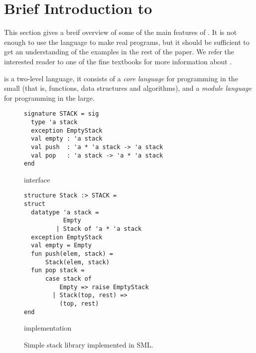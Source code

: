 \documentclass[workingdraft]{usetex-v1}
\begin{document}
\section{Brief Introduction to \sml{}}
\label{sec:brief-intr-sml}

This section gives a breif overview of some of the main features of
\sml{}.  It is not enough to use the language to make real programs,
but it should be sufficient to get an understanding of the examples in
the rest of the paper.  We refer the interested reader to one of the
fine textbooks \cite{Hansen-Rischel:1999,Paulson:1996} for more
information about \sml{}.



\sml{} is a two-level language, it consists of a \emph{core language}
for programming in the small (that is, functions, data structures and
algorithms), and a \emph{module language} for programming in the large.


\begin{figure*}[thp]
\mbox{}\hfill{}

\begin{subfloat}
\begin{minipage}[b]{.46\linewidth}
\begin{verbatim}
signature STACK = sig 
  type 'a stack
  exception EmptyStack
  val empty : 'a stack
  val push  : 'a * 'a stack -> 'a stack
  val pop   : 'a stack -> 'a * 'a stack
end
\end{verbatim}
\end{minipage}
\caption{\label{fig:stack-sig}interface}
\end{subfloat}
\qquad
\begin{subfloat}
\begin{minipage}[b]{.46\linewidth}
\begin{verbatim}
structure Stack :> STACK =
struct
  datatype 'a stack =
           Empty
         | Stack of 'a * 'a stack
  exception EmptyStack
  val empty = Empty
  fun push(elem, stack) = 
      Stack(elem, stack)
  fun pop stack =
      case stack of
          Empty => raise EmptyStack
        | Stack(top, rest) => 
          (top, rest)
end
\end{verbatim}
\end{minipage}
\caption{\label{fig:stack-struct}implementation}
\end{subfloat}
\hfill\mbox{}
\caption{Simple stack library implemented in SML.}
  \label{fig:stack-lib}
\end{figure*}
\end{document}
